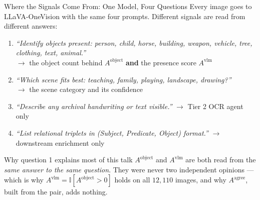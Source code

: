 \documentclass[aspectratio=169,11pt]{beamer}
\begin{document}
\begin{frame}{Where the Signals Come From: One Model, Four Questions}
\small
Every image goes to LLaVA-OneVision with the same four prompts. Different signals are read from different answers:
\vspace{1mm}
\begin{enumerate}\footnotesize\itemsep3pt
  \item \emph{``Identify objects present: person, child, horse, building, weapon, vehicle, tree, clothing, text, animal.''}\\ $\rightarrow$ the object count behind $A^{\text{object}}$ \textbf{and} the presence score $A^{\text{vlm}}$
  \item \emph{``Which scene fits best: teaching, family, playing, landscape, drawing?''}\\ $\rightarrow$ the scene category and its confidence
  \item \emph{``Describe any archival handwriting or text visible.''} $\rightarrow$ Tier 2 OCR agent only
  \item \emph{``List relational triplets in (Subject, Predicate, Object) format.''} $\rightarrow$ downstream enrichment only
\end{enumerate}
\vspace{2mm}
\begin{alertblock}{\small Why question 1 explains most of this talk}
\footnotesize $A^{\text{object}}$ and $A^{\text{vlm}}$ are both read from the \emph{same answer to the same question}. They were never two independent opinions --- which is why $A^{\text{vlm}} = \mathbb{I}[A^{\text{object}}>0]$ holds on all $12{,}110$ images, and why $A^{\text{agree}}$, built from the pair, adds nothing.
\end{alertblock}
\end{frame}
\end{document}
